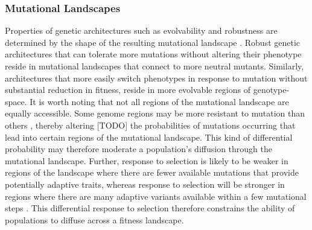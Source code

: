 \documentclass[10pt,letterpaper]{article}
\begin{document}
\subsubsection*{Mutational Landscapes}
Properties of genetic architectures such as evolvability and robustness are determined by the shape of the resulting mutational landscape \cite{andreas_wagner_robustness_2008}. Robust genetic architectures that can tolerate more mutations without altering their phenotype reside in mutational landscapes that connect to more neutral mutants. Similarly, architectures that more easily switch phenotypes in response to mutation without substantial reduction in fitness, reside in more evolvable regions of genotype-space.
It is worth noting that not all regions of the mutational landscape are equally accessible. Some genome regions may be more resistant to mutation than others \cite{lee_rate_2012}, thereby altering [\@RCK TODO] the probabilities of mutations occurring that lead into certain regions of the mutational landscape. This kind of differential probability may therefore moderate a population's diffusion through the mutational landscape.
%
%
Further, response to selection is likely to be weaker in regions of the landscape where there are fewer available mutations that provide potentially adaptive traits, whereas response to selection will be stronger in regions where there are many adaptive variants available within a few mutational steps \cite{alberch_genes_1991,carter_role_2005}. This differential response to selection therefore constrains the ability of populations to diffuse across a fitness landscape.
\end{document}
